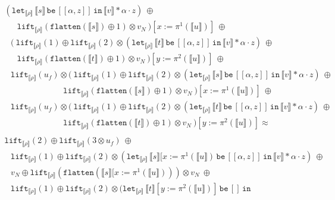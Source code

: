 \documentclass[a4paper,UKenglish,cleveref,autoref,numberwithinsect]{lipics-v2019}
\theoremstyle{definition}
\newcommand{\expair}[2]{[#1,#2]}
\newcommand{\flatten}{\mathtt{flatten}}
\newcommand{\lift}{\mathtt{lift}}
\newcommand{\typeinterpret}[1]{\llbracket #1 \rrbracket}
\newcommand{\interpret}[1]{\llbracket #1 \rrbracket}
\newcommand{\xlet}[4]{\mathtt{let}_{#1}\,#2\,\mathtt{be}\,[#3]\,\mathtt{in}\,#4}
\begin{document}
\begin{itemize}
\[\begin{array}{l}
    (\xlet{\typeinterpret{\rho}}{\interpret{s}}{\expair{\alpha}{z}}{
      \interpret{v} * \alpha \cdot z})\ \oplus \\
  \phantom{AB}
    \lift_{\typeinterpret{\rho}}(\flatten(\interpret{s}) \oplus 1)
    \otimes v_N\ )[x:=\pi^1(\interpret{u})]\ \oplus \\
  \phantom{A}
  (\ \lift_{\typeinterpret{\rho}}(1) \oplus
    \lift_{\typeinterpret{\rho}}(2) \otimes
    (\xlet{\typeinterpret{\rho}}{\interpret{t}}{\expair{\alpha}{z}}{
      \interpret{v} * \alpha \cdot z})\ \oplus \\
  \phantom{AB}
    \lift_{\typeinterpret{\rho}}(\flatten(\interpret{t}) \oplus 1)
    \otimes v_N\ )[y:=\pi^2(\interpret{u})]\ \oplus \\
  \phantom{A}
  \lift_{\typeinterpret{\rho}}(u_f) \otimes
  (\ \lift_{\typeinterpret{\rho}}(1) \oplus
    \lift_{\typeinterpret{\rho}}(2) \otimes
    (\xlet{\typeinterpret{\rho}}{\interpret{s}}{\expair{\alpha}{z}}{
      \interpret{v} * \alpha \cdot z})\ \oplus \\
  \phantom{ABCDEFGHIJ}
    \lift_{\typeinterpret{\rho}}(\flatten(\interpret{s}) \oplus 1)
    \otimes v_N\ )[x:=\pi^1(\interpret{u})]\ \oplus \\
  \phantom{A}
  \lift_{\typeinterpret{\rho}}(u_f) \otimes
  (\ \lift_{\typeinterpret{\rho}}(1) \oplus
    \lift_{\typeinterpret{\rho}}(2) \otimes
    (\xlet{\typeinterpret{\rho}}{\interpret{t}}{\expair{\alpha}{z}}{
      \interpret{v} * \alpha \cdot z})\ \oplus \\
  \phantom{ABCDEFGHIJ}
    \lift_{\typeinterpret{\rho}}(\flatten(\interpret{t}) \oplus 1)
    \otimes v_N\ )[y:=\pi^2(\interpret{u})] \approx \\
  \end{array}\]\[\begin{array}{l}
  \lift_{\typeinterpret{\rho}}(2) \oplus
  \lift_{\typeinterpret{\rho}}(3 \otimes u_f)\ \oplus \\
  \phantom{A}
  \lift_{\typeinterpret{\rho}}(1) \oplus
  \lift_{\typeinterpret{\rho}}(2) \otimes
  (\xlet{\typeinterpret{\rho}}{\interpret{s}[x:=\pi^1(\interpret{u})}{
    \expair{\alpha}{z}}{\interpret{v} * \alpha \cdot z})\ \oplus \\
  \phantom{A}
  v_N \oplus \lift_{\typeinterpret{\rho}}(\flatten(\interpret{s}[x:=
    \pi^1(\interpret{u}))) \otimes v_N\ \oplus \\
  \phantom{A}
  \lift_{\typeinterpret{\rho}}(1) \oplus
    \lift_{\typeinterpret{\rho}}(2) \otimes
    (\xlet{\typeinterpret{\rho}}{\interpret{t}[y:=\pi^2(\interpret{u})]}{
}
\end{array}\]
\end{itemize}
\end{document}
